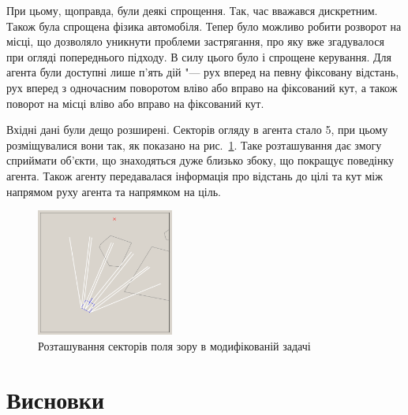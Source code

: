 \documentclass[a4paper,12pt]{article}
\begin{document}
При цьому, щоправда, були деякі спрощення. Так, час вважався дискретним. Також була спрощена фізика автомобіля. Тепер було можливо робити розворот на місці, що дозволяло уникнути проблеми застрягання, про яку вже згадувалося при огляді попереднього підходу. В силу цього було і спрощене керування. Для агента були доступні лише п'ять дій "--- рух вперед на певну фіксовану відстань, рух вперед з одночасним поворотом вліво або вправо на фіксований кут, а також поворот на місці вліво або вправо на фіксований кут. 

Вхідні дані були дещо розширені. Секторів огляду в агента стало 5, при цьому розміщувалися вони так, як показано на рис.~\ref{fig:tank-vis-area}. Таке розташування дає змогу сприймати об'єкти, що знаходяться дуже близько збоку, що покращує поведінку агента. Також агенту передавалася інформація про відстань до цілі та кут між напрямом руху агента та напрямком на ціль.
\begin{figure}
	\centering
	\includegraphics[width=0.4\textwidth]{tank-vis-area}
	\caption{Розташування секторів поля зору в модифікованій задачі}
	\label{fig:tank-vis-area}
\end{figure}

\section{Висновки}
\begin{thebibliography}{99}
\end{thebibliography}
\end{document}
